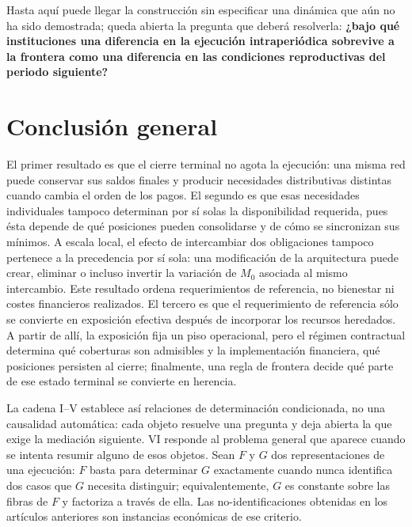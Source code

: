 \documentclass[10pt,a5paper,twoside]{article}
\newcommand{\RBfronttitle}[1]{\phantomsection\addcontentsline{toc}{section}{#1}}
\begin{document}
Hasta aquí puede llegar la construcción sin especificar una dinámica que
aún no ha sido demostrada; queda abierta la pregunta que deberá resolverla:
\textbf{¿bajo qué instituciones una diferencia en la ejecución
intraperiódica sobrevive a la frontera como una diferencia en las
condiciones reproductivas del periodo siguiente?}


\cleardoublepage\section*{Conclusión general}\label{conclusiuxf3n-general}\RBfronttitle{Conclusión general}\thispagestyle{plain}

El primer resultado es que el cierre terminal no agota la ejecución: una
misma red puede conservar sus saldos finales y producir necesidades
distributivas distintas cuando cambia el orden de los pagos. El segundo es
que esas necesidades individuales tampoco determinan por sí solas la
disponibilidad requerida, pues ésta depende de qué posiciones pueden
consolidarse y de cómo se sincronizan sus mínimos. A escala local, el efecto de
intercambiar dos obligaciones tampoco pertenece a la precedencia por sí sola:
una modificación de la arquitectura puede crear, eliminar o incluso invertir
la variación de \(M_0\) asociada al mismo intercambio. Este resultado ordena
requerimientos de referencia, no bienestar ni costes financieros realizados.
El tercero es que el requerimiento de referencia sólo se convierte en exposición efectiva después
de incorporar los recursos heredados. A partir de allí, la exposición fija un
piso operacional, pero el régimen contractual determina qué coberturas son
admisibles y la implementación financiera, qué posiciones persisten al
cierre; finalmente, una regla de frontera decide qué parte de ese estado
terminal se convierte en herencia.

La cadena I--V establece así relaciones de determinación condicionada, no una
causalidad automática: cada objeto resuelve una pregunta y deja abierta la que
exige la mediación siguiente. VI responde al problema general que aparece
cuando se intenta resumir alguno de esos objetos. Sean \(F\) y \(G\) dos
representaciones de una ejecución: \(F\) basta para determinar \(G\)
exactamente cuando nunca identifica dos casos que \(G\) necesita distinguir;
equivalentemente, \(G\) es constante sobre las fibras de \(F\) y factoriza a
través de ella. Las no-identificaciones obtenidas en los artículos anteriores
son instancias económicas de ese criterio.
\end{document}

